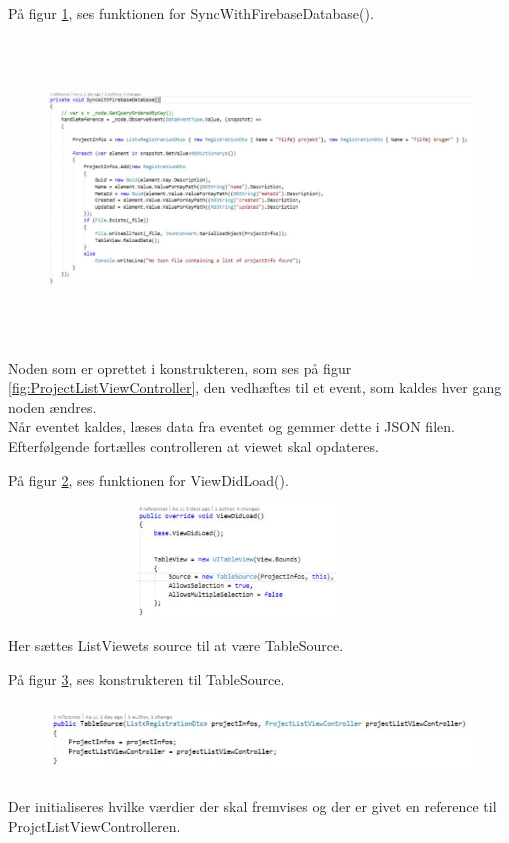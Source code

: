 \clearpage

På figur \ref{fig:SyncWithDB}, ses funktionen for SyncWithFirebaseDatabase().
\begin{figure}[H] %
	\centering
	\includegraphics[height=8cm, width=15cm]{../ArkitekturDesign/Design/ProjectList/SyncWithDB}
	\caption{}
	\label{fig:SyncWithDB}
\end{figure}
Noden som er oprettet i konstrukteren, som ses på figur \ref{fig:ProjectListViewController}, den vedhæftes til et event, som kaldes hver gang noden ændres. \\
Når eventet kaldes, læses data fra eventet og gemmer dette i JSON filen. Efterfølgende fortælles controlleren at viewet skal opdateres.

På figur \ref{fig:ViewDidLoad}, ses funktionen for ViewDidLoad().
\begin{figure}[H] %
	\centering
	\includegraphics[height=3cm, width=10cm]{../ArkitekturDesign/Design/ProjectList/ViewDidLoad}
	\caption{}
	\label{fig:ViewDidLoad}
\end{figure}
Her sættes ListViewets source til at være TableSource.

På figur \ref{fig:TableSource}, ses konstrukteren til TableSource.
\begin{figure}[H] %
	\centering
	\includegraphics[height=2cm, width=15cm]{../ArkitekturDesign/Design/ProjectList/TableSource}
	\caption{}
	\label{fig:TableSource}
\end{figure}
Der initialiseres hvilke værdier der skal fremvises og der er givet en reference til ProjctListViewControlleren.

